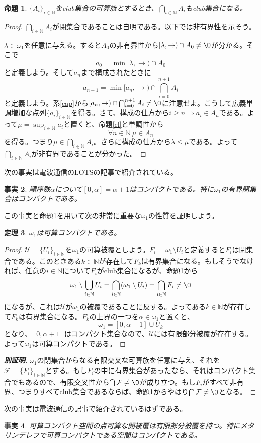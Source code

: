 \documentclass[leqno]{jsarticle}
\newtheorem{thm}{定理}
\newtheorem{prop}[thm]{命題}
\newtheorem{fact}[thm]{事実}
\newcommand{\To}{\Longrightarrow}
\newcommand{\nn}{\mathbb{N}}
\newcommand{\dpst}{\displaystyle}
\newcommand{\al}{\alpha}
\newcommand{\la}{\lambda}
\begin{document}
\begin{prop}\label{daiji}\normalfont
$\{A_i\}_{i\in \nn}$をclub集合の可算族とするとき、$\dpst \bigcap_{i\in \nn}A_i$もclub集合になる。
\end{prop}
\begin{proof}
$\dpst \bigcap_{i\in \nn}A_i$が閉集合であることは自明である。以下では非有界性を示そう。\par
$\la\in \omega_1$を任意に与える。すると$A_0$の非有界性から$[\la,\to)\cap A_0\neq\O$が分かる。そこで
\[
a_0=\min[\la,\to)\cap A_0
\]
と定義しよう。そして$a_n$まで構成されたときに
\[
a_{n+1}=\min[a_n,\to)\cap \bigcap_{i=0}^{n+1}A_i
\]
と定義しよう。系\ref{cap}から$[a_n,\to)\cap \bigcap_{i=0}^{n+1}A_i\neq\O$に注意せよ。こうして広義単調増加な点列$\{a_i\}_{i\in \nn}$を得る。さて、構成の仕方から$i\ge n\To a_i\in A_n$である。よって$\dpst \mu=\sup_{i\in \nn}a_i$と置くと、命題\ref{cl}と単調性から
\[
\forall n\in \nn \ \mu\in A_n
\]
を得る。つまり$\mu\in \bigcap_{i\in \nn}A_i$。さらに構成の仕方から$\la\le \mu$である。よって$\dpst \bigcap_{i\in \nn}A_i$が非有界であることが分かった。
\end{proof}
次の事実は電波通信のLOTSの記事で紹介されている。
\begin{fact}
順序数$\al$について$[0,\al]=\al+1$はコンパクトである。特に$\omega_1$の有界閉集合はコンパクトである。
\end{fact}
この事実と命題\ref{daiji}を用いて次の非常に重要な$\omega_1$の性質を証明しよう。
\begin{thm}
$\omega_1$は可算コンパクトである。
\end{thm}
\begin{proof}
$\mathcal{U}=\{U_i\}_{i\in \nn}$を$\omega_1$の可算被覆としよう。$F_i=\omega_1\setminus U_i$と定義すると$F_i$は閉集合である。このときある$k\in \nn$が存在して$F_k$は有界集合になる。もしそうでなければ、任意の$i\in \nn$について$F_i$がclub集合になるが、命題\ref{daiji}から
\[
\omega_1\setminus\bigcup_{i\in \nn}U_i=\bigcap_{i\in\nn}(\omega_1\setminus U_i)=\bigcap_{i\in \nn}F_i\neq\O
\]
になるが、これは$\mathcal{U}$が$\omega_1$の被覆であることに反する。よってある$k\in \nn$が存在して$F_k$は有界集合になる。$F_k$の上界の一つを$\al\in \omega_1$と置くと、
\[
\omega_1=[0,\al+1]\cup U_k
\]
となり、$[0,\al+1]$はコンパクト集合なので、$\mathcal{U}$には有限部分被覆が存在する。よって$\omega_1$は可算コンパクトである。
\end{proof}
\begin{proof}[\textbf{別証明}]
$\omega_1$の閉集合からなる有限交叉な可算族を任意に与え、それを$\mathcal{F}=\{F_i\}_{i\in \nn}$とする。もし$F_i$の中に有界集合があったなら、それはコンパクト集合でもあるので、有限交叉性から$\bigcap\mathcal{F}\neq\O$が成り立つ。もし$F_i$がすべて非有界、つまりすべてclub集合であるならば、命題\ref{daiji}からやはり$\bigcap\mathcal{F}\neq\O$となる。
\end{proof}
次の事実は電波通信の記事で紹介されているはずである。
\begin{fact}
可算コンパクト空間の点可算な開被覆は有限部分被覆を持つ。特にメタリンデレフで可算コンパクトである空間はコンパクトである。
\end{fact}
\end{document}
